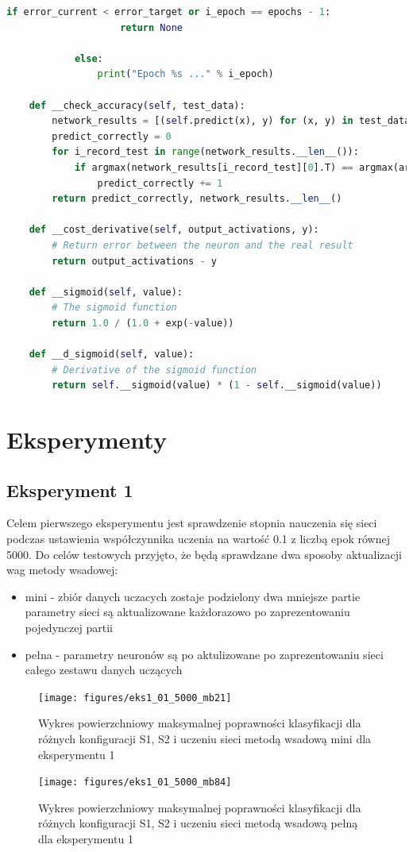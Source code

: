 \documentclass[12pt,twoside]{article}
\begin{document}
\begin{lstlisting}[caption={Plik klasy Network - network.py},label={Lst:network_py},language=Python,basicstyle=\scriptsize]
                if error_current < error_target or i_epoch == epochs - 1:
                    return None

            else:
                print("Epoch %s ..." % i_epoch)

    def __check_accuracy(self, test_data):
        network_results = [(self.predict(x), y) for (x, y) in test_data]
        predict_correctly = 0
        for i_record_test in range(network_results.__len__()):
            if argmax(network_results[i_record_test][0].T) == argmax(array(test_data[i_record_test][1])).T:
                predict_correctly += 1
        return predict_correctly, network_results.__len__()

    def __cost_derivative(self, output_activations, y):
        # Return error between the neuron and the real result
        return output_activations - y

    def __sigmoid(self, value):
        # The sigmoid function
        return 1.0 / (1.0 + exp(-value))

    def __d_sigmoid(self, value):
        # Derivative of the sigmoid function
        return self.__sigmoid(value) * (1 - self.__sigmoid(value))

\end{lstlisting}


\newpage
\section{Eksperymenty}
\subsection{Eksperyment 1} \label{subsec:eks_1}
Celem pierwszego eksperymentu jest sprawdzenie stopnia nauczenia się sieci podczas ustawienia współczynnika uczenia na wartość 0.1 z liczbą epok równej 5000.
Do celów testowych przyjęto, że będą sprawdzane dwa sposoby aktualizacji wag metody wsadowej:
\begin{itemize}
	\item mini - zbiór danych uczacych zostaje podzielony dwa mniejsze partie parametry sieci są aktualizowane każdorazowo po zaprezentowaniu pojedynczej partii
	\item pełna - parametry neuronów są po aktulizowane po zaprezentowaniu sieci całego zestawu danych uczących
\end{itemize}
\begin{figure}[ht!]
	\centering
	\texttt{[image: figures/eks1\_01\_5000\_mb21]}
	\caption{Wykres powierzchniowy maksymalnej poprawności klasyfikacji dla różnych konfiguracji S1, S2 i uczeniu sieci metodą wsadową mini dla eksperymentu 1}
	\label{Fig:eks1_01_5000_mb21}
\end{figure}
\begin{figure}[ht!]
	\centering
	\texttt{[image: figures/eks1\_01\_5000\_mb84]}
	\caption{Wykres powierzchniowy maksymalnej poprawności klasyfikacji dla różnych konfiguracji S1, S2 i uczeniu sieci metodą wsadową pełną dla eksperymentu 1}
	\label{Fig:eks1_01_5000_mb84}
\end{figure}
\newpage
\end{document}
